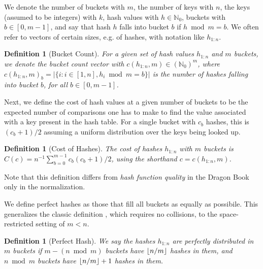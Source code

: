 \documentclass[sigconf]{acmart}
\DeclarePairedDelimiter{\floor}{\lfloor}{\rfloor}
\newcommand*{\natnumzero}{\mathbb{N}_0}
\newtheorem{definition}[theorem]{Definition}
\renewcommand{\label}[1]{%
    \gdef\sfname{sf:##1}}%
\begin{document}

We denote the number of buckets with $m$, the number of keys with $n$, the keys (assumed to be integers) with $k$, hash values with $h \in \natnumzero$, buckets with $b \in [0,m-1]$, and say that hash $h$ falls into bucket $b$ if $h \bmod m = b$.
We often refer to vectors of certain sizes, e.g. of hashes, with notation like $h_{1:n}$.

\begin{definition}[Bucket Count]
For a given set of hash values $h_{1:n}$ and $m$ buckets, we denote the bucket count vector with $c(h_{1:n}, m) \in (\natnumzero)^m$, where $c(h_{1:n}, m)_b = \vert\{i \colon i \in [1, n], h_i \bmod m = b\}\vert$ is the number of hashes falling into bucket $b$, for all $b \in [0,m-1]$.
\end{definition}

Next, we define the cost of hash values at a given number of buckets to be the expected number of comparisons one has to make to find the value associated with a key present in the hash table.
For a single bucket with $c_b$ hashes, this is $(c_b+1)/2$ assuming a uniform distribution over the keys being looked up.

\begin{definition}[Cost of Hashes]
\label{def:cost-of-hashes}
The cost of hashes $h_{1:n}$ with $m$ buckets is $C(c) = n^{-1} \sum_{b=0}^{m-1} c_b(c_b+1)/2$, using the shorthand $c=c(h_{1:n}, m)$.
\end{definition}
\noindent Note that this definition differs from \emph{hash function quality} in the Dragon Book \citep{dragonbook} only in the normalization.

We define perfect hashes as those that fill all buckets as equally as possibile.
This generalizes the classic definition \citep{fredman1984storing}, which requires no collisions, to the space-restricted setting of $m<n$.
\begin{definition}[Perfect Hash]
We say the hashes $h_{1:n}$ are perfectly distributed in $m$ buckets if $m - (n \bmod m)$ buckets have $\floor{n/m}$ hashes in them, and $n \bmod m$ buckets have $\floor{n/m} + 1$ hashes in them.
\end{definition}
\end{document}
